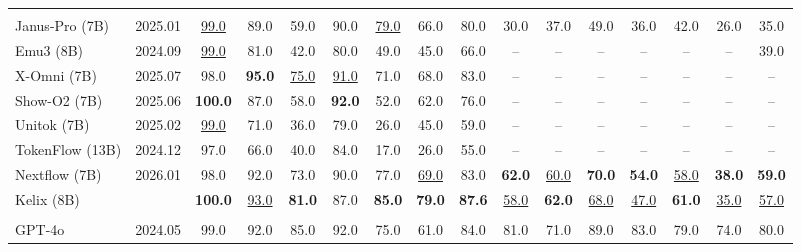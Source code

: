 \documentclass[11pt, a4paper, logo, copyright]{googledeepmind}
\begin{document}
\begin{table}[t]
{\begin{tabular}{l c  ccccccc  ccccccc}
    \rowcolor{blue!10}
    \multicolumn{16}{c}{\textbf{\textit{Discrete Tokenization}}} \\
    \rowcolor{blue!10}
    Janus-Pro (7B)        & 2025.01   & \underline{99.0} & 89.0 & 59.0 & 90.0 & \underline{79.0} & 66.0 & 80.0 & 30.0 & 37.0 & 49.0 & 36.0 & 42.0 & 26.0 & 35.0 \\
    \rowcolor{blue!10}
    Emu3 (8B)             & 2024.09   & \underline{99.0}   & 81.0   & 42.0   & 80.0   & 49.0   & 45.0   & 66.0 & --   & --   & --   & --   & --   & --   & 39.0 \\
    \rowcolor{blue!10}
    X-Omni (7B)           & 2025.07   & 98.0 & \textbf{95.0} & \underline{75.0} & \underline{91.0} & 71.0 & 68.0 & 83.0 & --   & --   & --   & --   & --   & --   & --   \\
    \rowcolor{blue!10}
    Show-O2 (7B)          & 2025.06   & \textbf{100.0}   & 87.0   & 58.0   & \textbf{92.0}   & 52.0   & 62.0 & 76.0 & --   & --   & --   & --   & --   & --   & --   \\
    \rowcolor{blue!10}
    Unitok (7B)           & 2025.02   & \underline{99.0}   & 71.0   & 36.0   & 79.0   & 26.0   & 45.0   & 59.0 & --   & --   & --   & --   & --   & --   & --   \\
    \rowcolor{blue!10}
    TokenFlow (13B)       & 2024.12   & 97.0   & 66.0   & 40.0   & 84.0   & 17.0   & 26.0   & 55.0 & --   & --   & --   & --   & --   & --   & --   \\
    \rowcolor{blue!10}
    Nextflow (7B)         & 2026.01   & 98.0   & 92.0   & 73.0   & 90.0   & 77.0   & \underline{69.0}   & 83.0 & \textbf{62.0}   & \underline{60.0}   & \textbf{70.0}   & \textbf{54.0}   & \underline{58.0}   & \textbf{38.0}   & \textbf{59.0} \\
    \rowcolor{blue!10}
    \rowcolor{blue!10}
    Kelix (8B) & & \textbf{100.0} & \underline{93.0} & \textbf{81.0} & 87.0 & \textbf{85.0} & \textbf{79.0} & \textbf{87.6} & \underline{58.0} & \textbf{62.0} & \underline{68.0} & \underline{47.0} & \textbf{61.0} & \underline{35.0} & \underline{57.0} \\
    \midrule
    
    \rowcolor{gray!10}
    \multicolumn{16}{l}{\textbf{Proprietary Models}} \\
    GPT-4o                & 2024.05   & 99.0 & 92.0 & 85.0 & 92.0 & 75.0 & 61.0 & 84.0 & 81.0 & 71.0 & 89.0 & 83.0 & 79.0 & 74.0 & 80.0 \\
    
    \bottomrule
    \end{tabular}
    }
    \label{tab:generation_results}
\end{table}
\end{document}
